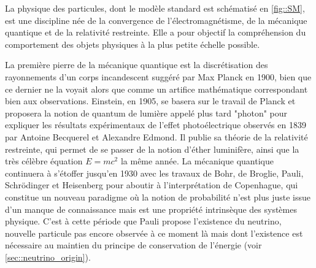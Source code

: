       La physique des particules, dont le modèle standard est schématisé en \autoref{fig::SM}, est une discipline née de la convergence de l'électromagnétisme, de la mécanique quantique et de la relativité restreinte. Elle a pour objectif la compréhension du comportement des objets physiques à la plus petite échelle possible.

      La première pierre de la mécanique quantique est la discrétisation des rayonnements d'un corps incandescent suggéré par Max Planck en 1900\cite{Planck1900}, bien que ce dernier ne la voyait alors que comme un artifice mathématique correspondant bien aux observations. Einstein, en 1905\cite{Einstein1905-quanta}, se basera sur le travail de Planck et proposera la notion de quantum de lumière appelé plus tard "photon" pour expliquer les résultats expérimentaux de l'effet photoélectrique observés en 1839 par Antoine Becquerel et Alexandre Edmond\cite{Becquerel1839}. Il publie sa théorie de la relativité restreinte\cite{Einstein1905-relat}, qui permet de se passer de la notion d'éther luminifère, ainsi que la très célèbre équation $E=mc^2$\cite{Einstein1905-emc2} la même année. La mécanique quantique continuera à s'étoffer jusqu'en 1930 avec les travaux de Bohr, de Broglie, Pauli, Schrödinger et Heisenberg pour aboutir à l'interprétation de Copenhague\cite{Heisenberg1949}, qui constitue un nouveau paradigme où la notion de probabilité n'est plus juste issue d'un manque de connaissance mais est une propriété intrinsèque des systèmes physique. C'est à cette période que Pauli propose l'existence du neutrino\cite{Pauli1930}, nouvelle particule pas encore observée à ce moment là mais dont l'existence est nécessaire au maintien du principe de conservation de l'énergie (voir \autoref{sec::neutrino_origin}).


